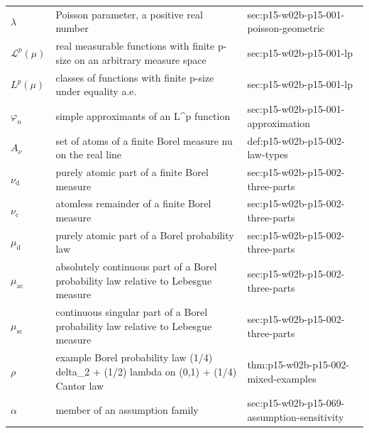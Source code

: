 \begin{longtable}{@{}p{}p{}p{}@{}}
\(\lambda\) & Poisson parameter, a positive real number & sec:\allowbreak{}p15-\allowbreak{}w02b-\allowbreak{}p15-\allowbreak{}001-\allowbreak{}poisson-\allowbreak{}geometric \\
\(\mathcal L^p(\mu)\) & real measurable functions with finite p-size on an arbitrary measure space & sec:\allowbreak{}p15-\allowbreak{}w02b-\allowbreak{}p15-\allowbreak{}001-\allowbreak{}lp \\
\(L^p(\mu)\) & classes of functions with finite p-size under equality a.e. & sec:\allowbreak{}p15-\allowbreak{}w02b-\allowbreak{}p15-\allowbreak{}001-\allowbreak{}lp \\
\(\varphi_n\) & simple approximants of an L\^{}p function & sec:\allowbreak{}p15-\allowbreak{}w02b-\allowbreak{}p15-\allowbreak{}001-\allowbreak{}approximation \\
\(A_\nu\) & set of atoms of a finite Borel measure nu on the real line & def:\allowbreak{}p15-\allowbreak{}w02b-\allowbreak{}p15-\allowbreak{}002-\allowbreak{}law-\allowbreak{}types \\
\(\nu_{\mathrm d}\) & purely atomic part of a finite Borel measure & sec:\allowbreak{}p15-\allowbreak{}w02b-\allowbreak{}p15-\allowbreak{}002-\allowbreak{}three-\allowbreak{}parts \\
\(\nu_{\mathrm c}\) & atomless remainder of a finite Borel measure & sec:\allowbreak{}p15-\allowbreak{}w02b-\allowbreak{}p15-\allowbreak{}002-\allowbreak{}three-\allowbreak{}parts \\
\(\mu_{\mathrm d}\) & purely atomic part of a Borel probability law & sec:\allowbreak{}p15-\allowbreak{}w02b-\allowbreak{}p15-\allowbreak{}002-\allowbreak{}three-\allowbreak{}parts \\
\(\mu_{\mathrm{ac}}\) & absolutely continuous part of a Borel probability law relative to Lebesgue measure & sec:\allowbreak{}p15-\allowbreak{}w02b-\allowbreak{}p15-\allowbreak{}002-\allowbreak{}three-\allowbreak{}parts \\
\(\mu_{\mathrm{sc}}\) & continuous singular part of a Borel probability law relative to Lebesgue measure & sec:\allowbreak{}p15-\allowbreak{}w02b-\allowbreak{}p15-\allowbreak{}002-\allowbreak{}three-\allowbreak{}parts \\
\(\rho\) & example Borel probability law (1/4) delta\_2 + (1/2) lambda on (0,1) + (1/4) Cantor law & thm:\allowbreak{}p15-\allowbreak{}w02b-\allowbreak{}p15-\allowbreak{}002-\allowbreak{}mixed-\allowbreak{}examples \\
\(\alpha\) & member of an assumption family & sec:\allowbreak{}p15-\allowbreak{}w02b-\allowbreak{}p15-\allowbreak{}069-\allowbreak{}assumption-\allowbreak{}sensitivity \\

\end{longtable}
